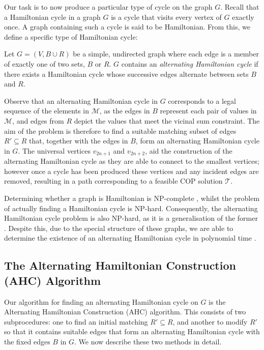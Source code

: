 \documentclass[authoryear]{elsarticle}
\begin{document}
Our task is to now produce a particular type of cycle on the graph $G$. Recall that a Hamiltonian cycle in a graph $G$ is a cycle that visits every vertex of $G$ exactly once. A graph containing such a cycle is said to be Hamiltonian. From this, we define a specific type of Hamiltonian cycle:

\begin{definition} %
	\label{defn:althamcycle}
	Let $G = (V, B \cup R)$ be a simple, undirected graph where each edge is a member of exactly one of two sets, $B$ or $R$. $G$ contains an \emph{alternating Hamiltonian cycle} if there exists a Hamiltonian cycle whose successive edges alternate between sets $B$ and $R$.
\end{definition}

\noindent Observe that an alternating Hamiltonian cycle in $G$ corresponds to a legal sequence of the elements in $\mathcal{M}$, as the edges in $B$ represent each pair of values in $\mathcal{M}$, and edges from $R$ depict the values that meet the vicinal sum constraint. The aim of the problem is therefore to find a suitable matching subset of edges $R' \subseteq R$ that, together with the edges in $B$, form an alternating Hamiltonian cycle in $G$. The universal vertices $v_{2n+1}$ and $v_{2n+2}$, aid the construction of the alternating Hamiltonian cycle as they are able to connect to the smallest vertices; however once a cycle has been produced these vertices and any incident edges are removed, resulting in a path corresponding to a feasible COP solution $\mathcal{T}$.

Determining whether a graph is Hamiltonian is NP-complete \citep{karp1972}, whilst the problem of actually finding a Hamiltonian cycle is NP-hard. Consequently, the alternating Hamiltonian cycle problem is also NP-hard, as it is a generalisation of the former \citep{haggkvist1977}. Despite this, due to the special structure of these graphs, we are able to determine the existence of an alternating Hamiltonian cycle in polynomial time \citep{hawa2018}. 

\subsection{The Alternating Hamiltonian Construction (AHC) Algorithm}
\label{sub:ahc}
\noindent Our algorithm for finding an alternating Hamiltonian cycle on $G$ is the Alternating Hamiltonian Construction (AHC) algorithm. This consists of two subprocedures: one to find an initial matching $R' \subseteq R$, and another to modify $R'$ so that it contains suitable edges that form an alternating Hamiltonian cycle with the fixed edges $B$ in $G$. We now describe these two methods in detail.
\end{document}
